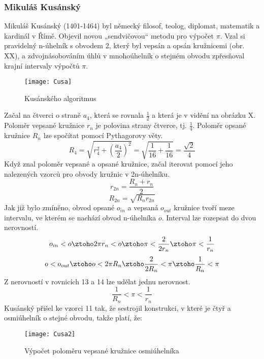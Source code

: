 \documentclass[rocnikovka]{gzwroc} %
\begin{document}
\subsubsection{Mikuláš Kusánský}
Mikuláš Kusánský (1401-1464) byl německý filosof, teolog, diplomat, matematik a kardinál v Římě. Objevil novou „sendvičovou“ metodu pro výpočet $\pi$. Vzal si pravidelný n-úhelník s obvodem 2, který byl vepsán a opsán kružnicemi (obr. XX), a zdvojnásobováním úhlů v mnohoúhelník o stejném obvodu zpřesňoval krajní intervaly výpočtů $\pi$.\\
\begin{figure}[!ht]
\texttt{[image: Cusa]}
\caption{Kusánského algoritmus}
\label{fig:kruh}
\end{figure}
Začal na čtverci o straně $a_4$, která se rovnala $\frac{1}{2}$ a která je v vidění na obrázku X. Poloměr vepsané kružnice $r_n$ je polovina strany čtverce, tj. $\frac{1}{4}$. Poloměr opsané kružnice $R_n$ lze spočítat pomocí Pythagorovy věty.
$$
R_4=\sqrt{r_4^2+\left(\frac{a_4}{2}\right)^2}=\sqrt{\frac{1}{16}+\frac{1}{16}}=\frac{\sqrt{2}}{4}
$$
Když znal poloměr vepsané a opsané kružnice, začal iterovat pomocí jeho nalezených vzorců pro obvody kružnic v 2n-úhelníku.
\begin{equation}
r_{2n}=\frac{R_n+r_n}{2} 
\end{equation}
\begin{equation}
R_{2n}=\sqrt{R_nr_{2n}}
\end{equation} 
Jak již bylo zmíněno, obvod opsané $o_{in}$ a vepsaná $o_{out}$ kružnice tvoří meze intervalu, ve kterém se nachází obvod n-úhelníka $o$. Interval lze rozepsat do dvou nerovností.
\begin{equation}
o_{in}<o \ztoho 2\pi r_n<o \ztoho \pi<\frac{2}{2r_n} \ztoho \pi<\frac{1}{r_n}
\end{equation}
\begin{equation}
o<o_{out} \ztoho o<2\pi R_n \ztoho \frac{2}{2R_n}<\pi \ztoho \frac{1}{R_n}<\pi
\end{equation}
Z nerovností v rovnicích 13 a 14 lze udělat jednu nerovnost.
\begin{equation}
\frac{1}{R_n}<\pi<\frac{1}{r_n}
\end{equation}
Kusánský přišel ke vzorci 11 tak, že sestrojil konstrukci, v které je čtyř a osmiúhelník o stejné obvodu, takže platí, že:
\begin{figure}[!ht]
\texttt{[image: Cusa2]}
\caption{Výpočet poloměru vepsané kružnice osmiúhelníka}
\label{fig:kruh}
\end{figure}
\end{document}
